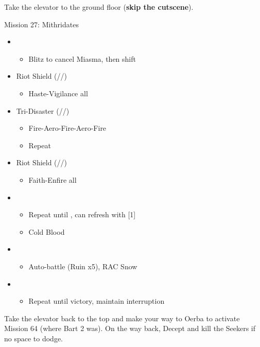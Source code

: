 \renewcommand{\first}{[1] Tri-Disaster (\rav/\rav/\rav)}
\renewcommand{\fourth}{[4] Riot Shield (\syn/\sen/\rav)}

Take the elevator to the ground floor (\textbf{skip the cutscene}).
\vfill

\begin{battle}{Mission 27: Mithridates}
	\begin{itemize}
		\item \third
			\begin{itemize}
				\item Blitz to cancel Miasma, then shift
			\end{itemize}
		\item \fourth
			\begin{itemize}
				\item Haste-Vigilance all
			\end{itemize}
		\item \first
			\begin{itemize}
				\item Fire-Aero-Fire-Aero-Fire
				\item Repeat
			\end{itemize}
		\item \fourth
			\begin{itemize}
				\item Faith-Enfire all
			\end{itemize}
		\item \fifth
			\begin{itemize}
				\item Repeat until \stagger, can refresh with [1]
				\item Cold Blood
			\end{itemize}
		\item \sixth
			\begin{itemize}
				\item Auto-battle (Ruin x5), RAC Snow
			\end{itemize}
		\item \second
			\begin{itemize}
				\item Repeat until victory, maintain interruption
			\end{itemize}
	\end{itemize}
\end{battle}

Take the elevator back to the top and make your way to Oerba to activate Mission 64 (where Bart 2 was).
On the way back, Decept and kill the Seekers if no space to dodge.

